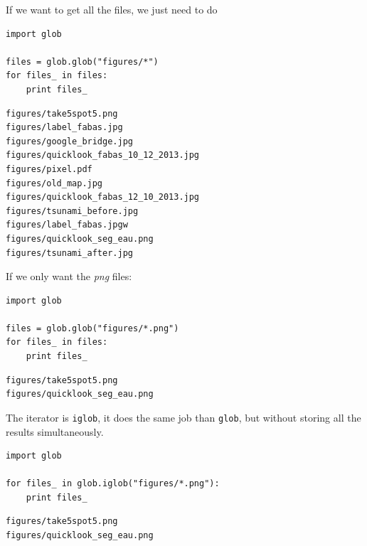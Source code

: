 \documentclass[a4paper,11pt,DIV=18]{scrartcl}
\begin{document}
If we want to get all the files, we just need to do

\begin{verbatim}
import glob

files = glob.glob("figures/*")
for files_ in files:
    print files_
\end{verbatim}

\begin{verbatim}
figures/take5spot5.png
figures/label_fabas.jpg
figures/google_bridge.jpg
figures/quicklook_fabas_10_12_2013.jpg
figures/pixel.pdf
figures/old_map.jpg
figures/quicklook_fabas_12_10_2013.jpg
figures/tsunami_before.jpg
figures/label_fabas.jpgw
figures/quicklook_seg_eau.png
figures/tsunami_after.jpg
\end{verbatim}

If we only want the \emph{png} files:

\begin{verbatim}
import glob

files = glob.glob("figures/*.png")
for files_ in files:
    print files_
\end{verbatim}

\begin{verbatim}
figures/take5spot5.png
figures/quicklook_seg_eau.png
\end{verbatim}

The iterator is \texttt{iglob}, it does the same job than \texttt{glob}, but without storing all the results simultaneously.

\begin{verbatim}
import glob

for files_ in glob.iglob("figures/*.png"):
    print files_
\end{verbatim}

\begin{verbatim}
figures/take5spot5.png
figures/quicklook_seg_eau.png
\end{verbatim}
\end{document}
